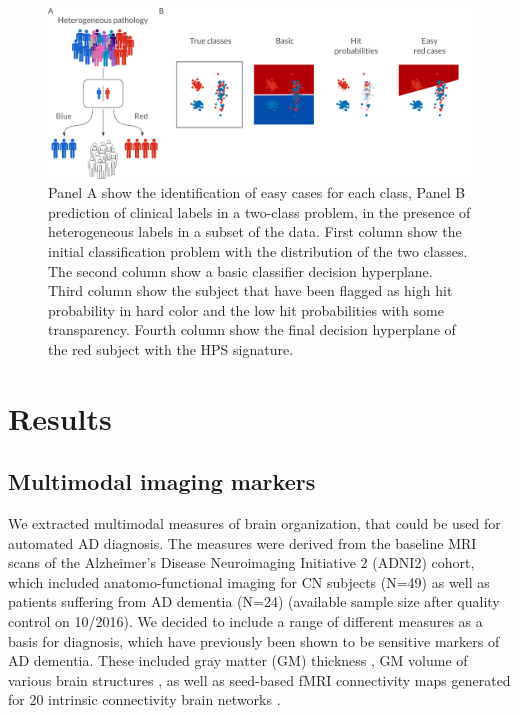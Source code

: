 \documentclass[authoryear]{elsarticle}
\begin{document}
\begin{figure}[ht]%
\begin{center}
\includegraphics[width=0.8\linewidth]{figures/toy_demo.png}
\end{center}
\caption[HPS identification]{Panel A show the identification of easy cases for each class, Panel B prediction of clinical labels in a two-class problem, in the presence of heterogeneous labels in a subset of the data. First column show the initial classification problem with the distribution of the two classes. The second column show a basic classifier decision hyperplane. Third column show the subject that have been flagged as high hit probability in hard color and the low hit probabilities with some transparency. Fourth column show the final decision hyperplane of the red subject with the HPS signature.
}

\label{fig_biotype_modes_toy}
\end{figure}


\section{Results}
\subsection*{Multimodal imaging markers}
We extracted multimodal measures of brain organization, that could be used for automated AD diagnosis. The measures were derived from the baseline MRI scans of the Alzheimer's Disease Neuroimaging Initiative 2 (ADNI2) cohort, which included anatomo-functional imaging for CN subjects (N=49) as well as patients suffering from AD dementia (N=24) (available sample size after quality control on 10/2016). We decided to include a range of different measures as a basis for diagnosis, which have previously been shown to be sensitive markers of AD dementia. These included gray matter (GM) thickness \citep{Querbes2009,Eskildsen2013}, GM volume of various brain structures \citep{Karas2004}, as well as seed-based fMRI connectivity maps generated for 20 intrinsic connectivity brain networks \citep{Bellec2015}.   
\end{document}
